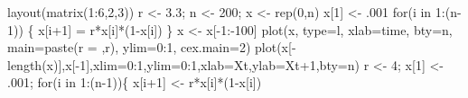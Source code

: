 \documentclass[
  a4paper,
  DIV=11,
  numbers=noendperiod,
  oneside]{scrreprt}
\newenvironment{Shaded}{}{}
\newcommand{\AttributeTok}[1]{\textcolor[rgb]{0.84,0.23,0.29}{#1}}
\newcommand{\ControlFlowTok}[1]{\textcolor[rgb]{0.84,0.23,0.29}{#1}}
\newcommand{\DecValTok}[1]{\textcolor[rgb]{0.00,0.36,0.77}{#1}}
\newcommand{\FloatTok}[1]{\textcolor[rgb]{0.00,0.36,0.77}{#1}}
\newcommand{\FunctionTok}[1]{\textcolor[rgb]{0.44,0.26,0.76}{#1}}
\newcommand{\NormalTok}[1]{\textcolor[rgb]{0.14,0.16,0.18}{#1}}
\newcommand{\OtherTok}[1]{\textcolor[rgb]{0.44,0.26,0.76}{#1}}
\newcommand{\SpecialCharTok}[1]{\textcolor[rgb]{0.00,0.36,0.77}{#1}}
\newcommand{\StringTok}[1]{\textcolor[rgb]{0.01,0.18,0.38}{#1}}
\begin{document}
\begin{Shaded}
\begin{Highlighting}[]
\FunctionTok{layout}\NormalTok{(}\FunctionTok{matrix}\NormalTok{(}\DecValTok{1}\SpecialCharTok{:}\DecValTok{6}\NormalTok{,}\DecValTok{2}\NormalTok{,}\DecValTok{3}\NormalTok{))}
\NormalTok{r }\OtherTok{\textless{}{-}} \FloatTok{3.3}\NormalTok{; n }\OtherTok{\textless{}{-}} \DecValTok{200}\NormalTok{; x }\OtherTok{\textless{}{-}} \FunctionTok{rep}\NormalTok{(}\DecValTok{0}\NormalTok{,n)}
\NormalTok{x[}\DecValTok{1}\NormalTok{] }\OtherTok{\textless{}{-}}\NormalTok{ .}\DecValTok{001}
\ControlFlowTok{for}\NormalTok{(i }\ControlFlowTok{in} \DecValTok{1}\SpecialCharTok{:}\NormalTok{(n}\DecValTok{{-}1}\NormalTok{)) \{}
\NormalTok{  x[i}\SpecialCharTok{+}\DecValTok{1}\NormalTok{] }\OtherTok{=}\NormalTok{ r}\SpecialCharTok{*}\NormalTok{x[i]}\SpecialCharTok{*}\NormalTok{(}\DecValTok{1}\SpecialCharTok{{-}}\NormalTok{x[i])}
\NormalTok{\}}
\NormalTok{x }\OtherTok{\textless{}{-}}\NormalTok{ x[}\SpecialCharTok{{-}}\DecValTok{1}\SpecialCharTok{:{-}}\DecValTok{100}\NormalTok{]}
\FunctionTok{plot}\NormalTok{(x, }\AttributeTok{type=}\StringTok{\textquotesingle{}l\textquotesingle{}}\NormalTok{, }\AttributeTok{xlab=}\StringTok{\textquotesingle{}time\textquotesingle{}}\NormalTok{, }\AttributeTok{bty=}\StringTok{\textquotesingle{}n\textquotesingle{}}\NormalTok{, }\AttributeTok{main=}\FunctionTok{paste}\NormalTok{(}\StringTok{\textquotesingle{}r = \textquotesingle{}}\NormalTok{,r),}
     \AttributeTok{ylim=}\DecValTok{0}\SpecialCharTok{:}\DecValTok{1}\NormalTok{, }\AttributeTok{cex.main=}\DecValTok{2}\NormalTok{) }
\FunctionTok{plot}\NormalTok{(x[}\SpecialCharTok{{-}}\FunctionTok{length}\NormalTok{(x)],x[}\SpecialCharTok{{-}}\DecValTok{1}\NormalTok{],}\AttributeTok{xlim=}\DecValTok{0}\SpecialCharTok{:}\DecValTok{1}\NormalTok{,}\AttributeTok{ylim=}\DecValTok{0}\SpecialCharTok{:}\DecValTok{1}\NormalTok{,}\AttributeTok{xlab=}\StringTok{\textquotesingle{}Xt\textquotesingle{}}\NormalTok{,}\AttributeTok{ylab=}\StringTok{\textquotesingle{}Xt+1\textquotesingle{}}\NormalTok{,}\AttributeTok{bty=}\StringTok{\textquotesingle{}n\textquotesingle{}}\NormalTok{)}
\NormalTok{r }\OtherTok{\textless{}{-}} \DecValTok{4}\NormalTok{; x[}\DecValTok{1}\NormalTok{] }\OtherTok{\textless{}{-}}\NormalTok{ .}\DecValTok{001}\NormalTok{;}
\ControlFlowTok{for}\NormalTok{(i }\ControlFlowTok{in} \DecValTok{1}\SpecialCharTok{:}\NormalTok{(n}\DecValTok{{-}1}\NormalTok{))\{}
\NormalTok{  x[i}\SpecialCharTok{+}\DecValTok{1}\NormalTok{] }\OtherTok{\textless{}{-}}\NormalTok{ r}\SpecialCharTok{*}\NormalTok{x[i]}\SpecialCharTok{*}\NormalTok{(}\DecValTok{1}\SpecialCharTok{{-}}\NormalTok{x[i])  }

\end{Highlighting}
\end{Shaded}
\end{document}

